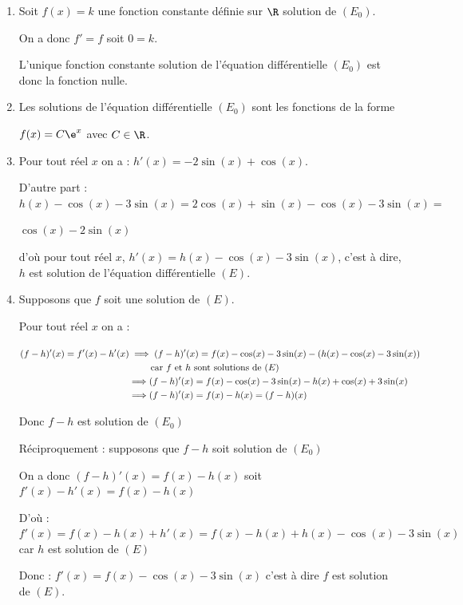 
		\medskip

		\begin{enumerate}
			\item Soit $f(x)=k$ une fonction constante définie sur $\R$ solution de $\left( E_0\right)$.

On a donc $f'=f$ soit $0=k$.

L'unique fonction constante solution de l'équation différentielle $\left(E_{0}\right)$ est donc la fonction nulle.

			\item Les solutions de l'équation différentielle $\left(E_{0}\right)$ sont les fonctions de la forme 

$f(x)=C\e^x$ avec $C \in \R$.



		\item


Pour tout réel $x$ on a : \quad $h'(x) =-2\sin(x) +\cos(x)$.

D'autre part : \quad $h(x)-\cos (x)-3 \sin (x)= 2 \cos (x)+\sin (x)- \cos (x)-3 \sin (x) =$

$ \cos(x)-2\sin(x)$

d'où pour tout réel $x$,  \quad$h'(x) = h(x) -\cos (x)-3 \sin (x)$,  c'est à dire, $h$ est solution de l'équation différentielle $(E)$.

			\item Supposons que  $f$ soit une solution de $(E)$.

Pour tout réel $x$ on a :

$\aligned[t] (f-h)'(x)=f'(x)-h'(x) &\implies (f-h)'(x)= f(x) -\cos (x)-3 \sin (x) - \left( h(x) -\cos (x)-3 \sin (x) \right)\\
&\qquad \text{  car $f$ et $h$ sont solutions de $(E)$}\\
&  \Longrightarrow (f-h)'(x)= f(x) -\cos (x)-3 \sin (x) - h(x) +\cos (x)+3 \sin (x) \\
&  \Longrightarrow (f-h)'(x)= f(x)  - h(x)   = (f-h)(x)\endaligned$

Donc $f-h$ est solution de $\left(E_{0}\right)$
\smallskip

Réciproquement : supposons que $f-h$ soit solution de $\left(E_{0}\right)$

On a donc $(f-h)'(x) = f(x)  - h(x)  $ soit $f'(x) -h'(x)= f(x) -h(x)$

D'où : $f'(x) = f(x) -h(x) +h'(x) = f(x) -h(x) + h(x) -\cos (x)-3 \sin (x)$ car $h$ est solution de $(E)$

Donc : $f'(x) =  f(x) -\cos (x)-3 \sin (x)$ c'est à dire $f$ est solution de $(E)$.


\end{enumerate}
